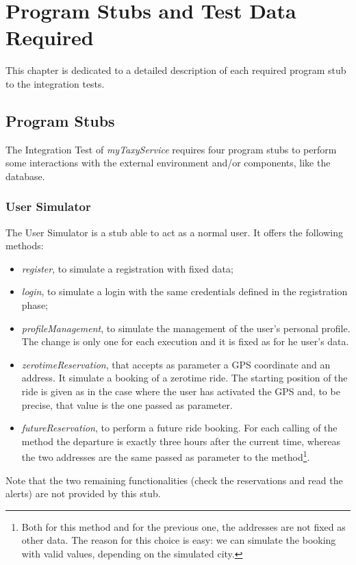 \documentclass[\mainpath/main]{subfiles}
\begin{document}
\chapter{Program Stubs and Test Data Required} %
\label{ProgramStubsAndTestDataRequired}

\setmyfancystyle

This chapter is dedicated to a detailed description of each required program stub to the integration tests.\\

\section{Program Stubs}
\label{ProgramStubsAndTestDataRequired:ProgramStubs}

The Integration Test of \textit{myTaxyService} requires four program stubs to perform some interactions with the external environment and/or components, like the database.

\subsection{User Simulator}
\label{ProgramStubsAndTestDataRequired:ProgramStubs:UserSimulator}

The User Simulator is a stub able to act as a normal user. It offers the following methods:
\begin{itemize}
	\item \textit{register}, to simulate a registration with fixed data;
	\item \textit{login}, to simulate a login with the same credentials defined in the registration phase;
	\item \textit{profileManagement}, to simulate the management of the user's personal profile. The change is only one for each execution and it is fixed as for he user's data.
	\item \textit{zerotimeReservation}, that accepts as parameter a GPS coordinate and an address. It simulate a booking of a zerotime ride. The starting position of the ride is given as in the case where the user has activated the GPS and, to be precise, that value is the one passed as parameter. 
	\item \textit{futureReservation}, to perform a future ride booking. For each calling of the method the departure is exactly three hours after the current time, whereas the two addresses are the same passed as parameter to the method\footnote{Both for this method and for the previous one, the addresses are not fixed as other data. The reason for this choice is easy: we can simulate the booking with valid values, depending on the simulated city.}.\\
\end{itemize}
Note that the two remaining functionalities (check the reservations and read the alerts) are not provided by this stub.
\end{document}

